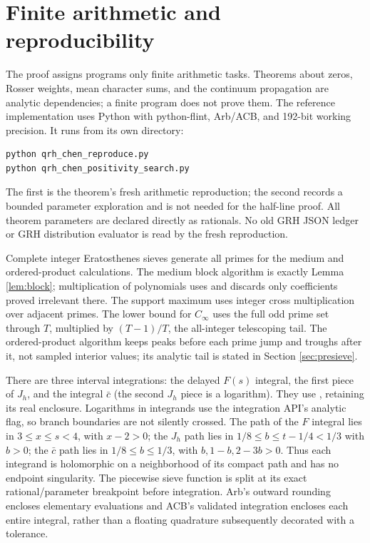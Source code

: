 \documentclass[11pt]{article}
\theoremstyle{remark}\newtheorem{remark}[theorem]{Remark}
\newcommand{\cert}[1]{\texttt{\detokenize{#1}}}
\begin{document}
\appendix
\section{Finite arithmetic and reproducibility}\label{sec:implementation}
The proof assigns programs only finite arithmetic tasks. Theorems about
zeros, Rosser weights, mean character sums, and the continuum propagation
are analytic dependencies; a finite program does not prove them.
The reference implementation uses Python with python-flint, Arb/ACB,
and 192-bit working precision. It runs from its own directory:
\begin{verbatim}
python qrh_chen_reproduce.py
python qrh_chen_positivity_search.py
\end{verbatim}
The first is the theorem's fresh arithmetic reproduction; the second
records a bounded parameter exploration and is not needed for the
half-line proof. All theorem parameters are declared directly as rationals.
No old GRH JSON ledger or GRH distribution evaluator is read by the
fresh reproduction.

Complete integer Eratosthenes sieves generate all primes for the medium
and ordered-product calculations. The medium block algorithm is exactly
Lemma \ref{lem:block}; multiplication of polynomials uses
\cert{arb_poly} and discards only coefficients proved irrelevant there.
The support maximum uses integer cross multiplication over adjacent
primes. The lower bound for $C_\infty$ uses the full odd prime set through
$T$, multiplied by $(T-1)/T$, the all-integer telescoping tail.
The ordered-product algorithm keeps peaks before each prime jump and
troughs after it, not sampled interior values; its analytic tail is stated
in Section \ref{sec:presieve}.

There are three interval integrations: the delayed $F(s)$ integral,
the first piece of $J_h$, and the integral $\bar c$ (the second $J_h$
piece is a logarithm). They use \cert{acb.integral}, retaining its real
enclosure. Logarithms in integrands use the integration API's analytic
flag, so branch boundaries are not silently crossed.
The path of the $F$ integral lies in $3\le x\le s<4$, with $x-2>0$;
the $J_h$ path lies in $1/8\le b\le t-1/4<1/3$ with $b>0$;
the $\bar c$ path lies in $1/8\le b\le1/3$, with $b,1-b,2-3b>0$.
Thus each integrand is holomorphic on a neighborhood of its compact
path and has no endpoint singularity. The piecewise sieve function is
split at its exact rational/parameter breakpoint before integration.
Arb's outward rounding encloses elementary evaluations and ACB's
validated integration encloses each entire integral, rather than a
floating quadrature subsequently decorated with a tolerance.
\end{document}
